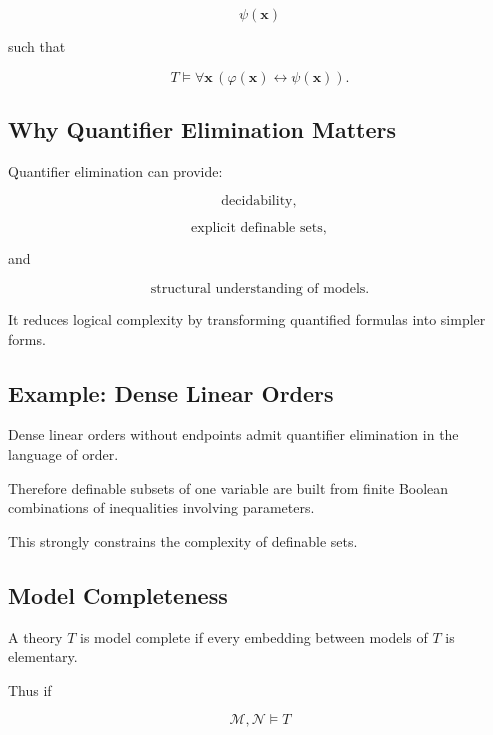 \[
\psi(\mathbf{x})
\]

such that

\[
\boxed{
T\models
\forall\mathbf{x}
\,
(
\varphi(\mathbf{x})
\leftrightarrow
\psi(\mathbf{x})
).
}
\]

\subsection{Why Quantifier Elimination Matters}
\label{subsec:why-quantifier-elimination}

Quantifier elimination can provide:

\[
\boxed{
\text{decidability},
}
\]

\[
\boxed{
\text{explicit definable sets},
}
\]

and

\[
\boxed{
\text{structural understanding of models}.
}
\]

It reduces logical complexity by transforming quantified formulas into
simpler forms.

\subsection{Example: Dense Linear Orders}
\label{subsec:dlo-quantifier-elimination}

Dense linear orders without endpoints admit quantifier elimination in the
language of order.

Therefore definable subsets of one variable are built from finite Boolean
combinations of inequalities involving parameters.

This strongly constrains the complexity of definable sets.

\subsection{Model Completeness}
\label{subsec:model-completeness}

A theory \(T\) is model complete if every embedding between models of \(T\)
is elementary.

Thus if

\[
\mathcal{M},
\mathcal{N}\models T
\]

